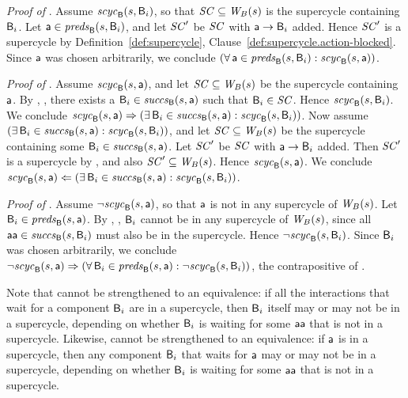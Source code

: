 \textit{Proof of }.
%
Assume $\mathit{scyc}_{\mathsf{B}}({s, \mathsf{B}_i})$, so that $\mathit{SC} \subseteq \mathit{W}_{B}({s})$ is the supercycle containing $\mathsf{B}_i$.
Let  $\mathsf{a} \in \mathit{preds}_{\mathsf{B}}({s, \mathsf{B}_i})$, and let $\mathit{SC}'$ be $\mathit{SC}$ with 
$\mathsf{a} \rightarrow \mathsf{B}_i$ added. Hence $\mathit{SC}'$ is a supercycle 
by Definition~\ref{def:supercycle},
  Clause~\ref{def:supercycle.action-blocked}.
Since $\mathsf{a}$ was chosen arbitrarily, we conclude 
$(\forall\, \mathsf{a} \in \mathit{preds}_{\mathsf{B}}({s, \mathsf{B}_i}) : \mathit{scyc}_{\mathsf{B}}({s, \mathsf{a}}))$.



\textit{Proof of }.
%
Assume $\mathit{scyc}_{\mathsf{B}}({s, \mathsf{a}})$, and let $\mathit{SC} \subseteq \mathit{W}_{B}({s})$ be the supercycle containing $\mathsf{a}$.  By
, , there exists a
$\mathsf{B}_i \in \mathit{succs}_{\mathsf{B}}({s, \mathsf{a}})$ such that $\mathsf{B}_i \in \mathit{SC}$.  Hence $\mathit{scyc}_{\mathsf{B}}({s, \mathsf{B}_i})$.
We conclude
$\mathit{scyc}_{\mathsf{B}}({s, \mathsf{a}}) \Rightarrow (\exists\, \mathsf{B}_i \in \mathit{succs}_{\mathsf{B}}({s, \mathsf{a}}) : \mathit{scyc}_{\mathsf{B}}({s, \mathsf{B}_i}))$.
%
Now assume $(\exists\, \mathsf{B}_i \in \mathit{succs}_{\mathsf{B}}({s, \mathsf{a}}) : \mathit{scyc}_{\mathsf{B}}({s, \mathsf{B}_i}))$, and let 
$\mathit{SC} \subseteq \mathit{W}_{B}({s})$ be the supercycle containing some $\mathsf{B}_i \in \mathit{succs}_{\mathsf{B}}({s, \mathsf{a}})$. 
Let $\mathit{SC}'$ be $\mathit{SC}$ with $\mathsf{a} \rightarrow \mathsf{B}_i$ added. Then $\mathit{SC}'$ is a supercycle by 
, and also $\mathit{SC}' \subseteq \mathit{W}_{B}({s})$. Hence $\mathit{scyc}_{\mathsf{B}}({s, \mathsf{a}})$.
We conclude 
$\mathit{scyc}_{\mathsf{B}}({s, \mathsf{a}}) \Leftarrow (\exists\, \mathsf{B}_i \in \mathit{succs}_{\mathsf{B}}({s, \mathsf{a}}) : \mathit{scyc}_{\mathsf{B}}({s, \mathsf{B}_i}))$.


\textit{Proof of }.  
%
Assume $\neg \mathit{scyc}_{\mathsf{B}}({s, \mathsf{a}})$, so that $\mathsf{a}$ is not in any supercycle of $\mathit{W}_{B}({s})$.
Let $\mathsf{B}_i \in \mathit{preds}_{\mathsf{B}}({s, \mathsf{a}})$. 
By , , 
$\mathsf{B}_i$ cannot be in any supercycle of $\mathit{W}_{B}({s})$, since all $\mathsf{aa} \in \mathit{succs}_{\mathsf{B}}({s, \mathsf{B}_i})$ must
also be in the supercycle. Hence $\neg \mathit{scyc}_{\mathsf{B}}({s, \mathsf{B}_i})$.
Since $\mathsf{B}_i$ was chosen arbitrarily, we conclude
$\neg \mathit{scyc}_{\mathsf{B}}({s, \mathsf{a}}) \Rightarrow  (\forall\, \mathsf{B}_i \in \mathit{preds}_{\mathsf{B}}({s, \mathsf{a}}) : \neg \mathit{scyc}_{\mathsf{B}}({s, \mathsf{B}_i}))$, the
contrapositive of .  
\epr

Note that  cannot be strengthened to an equivalence: if all
the interactions that wait for a component $\mathsf{B}_i$ are in a supercycle, then $\mathsf{B}_i$ itself may or may
not be in a supercycle, depending on whether $\mathsf{B}_i$ is waiting for some $\mathsf{aa}$ that is not in a
supercycle.
%
Likewise,  cannot be strengthened to an equivalence: if $\mathsf{a}$
is in a supercycle, then any component $\mathsf{B}_i$ that waits for $\mathsf{a}$ may or may not be in a 
supercycle, depending on whether $\mathsf{B}_i$ is waiting for some $\mathsf{aa}$ that is not in a supercycle. 




